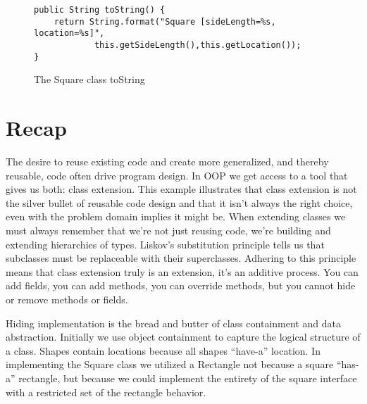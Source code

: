 \documentclass[]{tufte-handout}
\begin{document}
\begin{figure}
\begin{lstlisting}
public String toString() {
	return String.format("Square [sideLength=%s, location=%s]",
			this.getSideLength(),this.getLocation());
}
\end{lstlisting}
\label{fig:squtostr}
\caption{The Square class toString}
\end{figure}


\section{Recap}

The desire to reuse existing code and create more generalized, and thereby reusable, code often drive program design. In OOP we get access to a tool that gives us both: class extension. This example illustrates that class extension is not the silver bullet of reusable code design and that it isn't always the right choice, even with the problem domain implies it might be. When extending classes we must always remember that we're not just reusing code, we're building and extending hierarchies of types. Liskov's substitution principle tells us that subclasses must be replaceable with their superclasses. Adhering to this principle means that class extension truly is an extension, it's an additive process. You can add fields, you can add methods, you can override methods, but you cannot hide or remove methods or fields.

Hiding implementation is the bread and butter of class containment and data abstraction.  Initially we use object containment to capture the logical structure of a class. Shapes contain locations because all shapes ``have-a'' location. In implementing the Square class we utilized a Rectangle not because a square ``has-a'' rectangle, but because we could implement the entirety of the square interface with a restricted set of the rectangle behavior.
\end{document}

